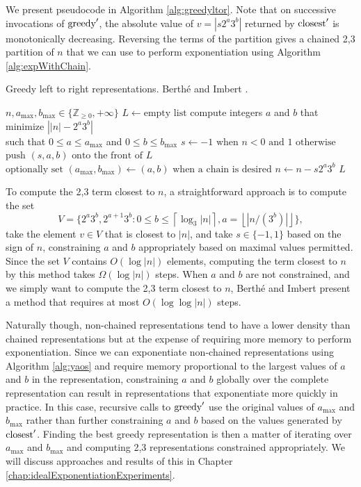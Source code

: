 \documentclass{ucalgthes1}
\theoremstyle{definition}
\newcommand{\ZZgez}{\mathbb{Z}_{\ge 0}}
\newcommand{\floor}[1]{\left\lfloor #1 \right\rfloor}
\newcommand{\ceil}[1]{\left\lceil #1 \right\rceil}
\newcommand{\amax}{a_\textrm{max}}
\newcommand{\bmax}{b_\textrm{max}}
\begin{document}
\noindent
We present pseudocode in Algorithm \ref{alg:greedyltor}. Note that on successive invocations of $\textrm{greedy}'$, the absolute value of $v=|s2^a3^b|$ returned by $\textrm{closest}'$ is monotonically decreasing.  Reversing the terms of the partition gives a chained 2,3 partition of $n$ that we can use to perform exponentiation using Algorithm \ref{alg:expWithChain}.

\begin{algorithm}[h]
\caption{Greedy left to right representations. Berth\'{e} and Imbert \cite{Berthe2009}.}
\label{alg:greedyltor}
\begin{algorithmic}[1]
\REQUIRE $n, \amax, \bmax \in \{\ZZgez, +\infty\}$ 
\STATE $L \gets \textrm{empty list}$
	\STATE compute integers $a$ and $b$ that minimize $\left||n| - 2^a3^b \right|$ \\
	       such that $0 \le a \le \amax$ and $0 \le b \le \bmax$
	\STATE $s \gets -1 \textrm{ when } n < 0 \textrm{ and } 1 \textrm{ otherwise}$
	\STATE $\textrm{push }(s, a, b) \textrm{ onto the front of } L$
	\STATE $\textrm{optionally set } (\amax, \bmax) \gets (a, b) \textrm{ when a chain is desired}$
	\STATE $n \gets n - s2^a3^b$
\ENDWHILE
\RETURN $L$
\end{algorithmic}
\end{algorithm}

To compute the 2,3 term closest to $n$, a straightforward approach is to compute the set 
\[
V = \{2^a3^b, 2^{a+1}3^b : 0 \le b \le \ceil{\log_3|n|}, a=\floor{|n/(3^b)|} \},
\]
take the element $v \in V$ that is closest to $|n|$, and take $s \in \{-1, 1\}$ based on the sign of $n$, constraining $a$ and $b$ appropriately based on maximal values permitted. Since the set $V$ contains $O(\log |n|)$ elements, computing the term closest to $n$ by this method takes $\Omega(\log |n|)$ steps.  When $a$ and $b$ are not constrained, and we simply want to compute the 2,3 term closest to $n$, Berth\'{e} and Imbert \cite{Berthe2009} present a method that requires at most $O(\log \log |n|)$ steps. 

Naturally though, non-chained representations tend to have a lower density than chained representations but at the expense of requiring more memory to perform exponentiation.  Since we can exponentiate non-chained representations using Algorithm \ref{alg:yaos} and require memory proportional to the largest values of $a$ and $b$ in the representation, constraining $a$ and $b$ globally over the complete representation can result in representations that exponentiate more quickly in practice. In this case, recursive calls to $\textrm{greedy}'$ use the original values of $\amax$ and $\bmax$ rather than further constraining $a$ and $b$ based on the values generated by $\textrm{closest}'$.  Finding the best greedy representation is then a matter of iterating over $\amax$ and $\bmax$ and computing 2,3 representations constrained appropriately.  We will discuss approaches and results of this in Chapter \ref{chap:idealExponentiationExperiments}.
\end{document}
